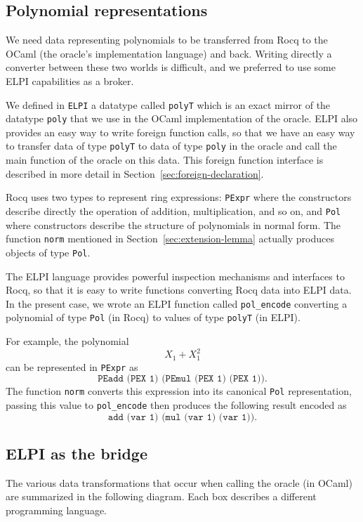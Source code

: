 \documentclass{jflart}
\begin{document}
\subsection{Polynomial representations}

We need data representing polynomials to be transferred from Rocq to the OCaml (the oracle's implementation language) and back.  Writing directly a converter between these two worlds is difficult, and we preferred to use some ELPI capabilities as a broker.

We defined in \texttt{ELPI} a datatype called \texttt{polyT} which is an exact mirror
of the datatype \texttt{poly} that we use in the OCaml implementation of the
oracle.  ELPI also provides an easy way to write foreign function calls, so
that we have an easy way to transfer data of type \texttt{polyT} to data of type \texttt{poly} in the oracle and call the main function of the oracle on this data.  This foreign function interface is described in more detail in Section~\ref{sec:foreign-declaration}.

Rocq uses two types to represent ring expressions: \texttt{PExpr} where the
constructors describe directly the operation of addition, multiplication, and
so on, and \texttt{Pol} where constructors describe the structure of polynomials
in normal form.  The function \texttt{norm} mentioned in
Section~\ref{sec:extension-lemma} actually produces objects of type \texttt{Pol}.

The ELPI language provides powerful inspection mechanisms and interfaces
to Rocq, so that it is easy to write functions converting Rocq data into ELPI
data.  In the present case, we wrote an ELPI function called
\texttt{pol\_encode} converting a polynomial
of type \texttt{Pol} (in Rocq) to values of type \texttt{polyT} (in ELPI).

For example, the polynomial
\[
  X_1+X_1^2
\]
can be represented in \texttt{PExpr} as
\[
  \texttt{PEadd (PEX 1) (PEmul (PEX 1) (PEX 1))}.
\]
The function \texttt{norm} converts this expression into its canonical
\texttt{Pol} representation, passing this value to \texttt{pol\_encode} then
produces the following result
encoded as
\[
  \texttt{add (var 1) (mul (var 1) (var 1))}.
\]

\subsection{ELPI as the bridge}
The various data transformations that occur when calling the oracle (in OCaml)
are summarized in the following diagram.  Each box describes a different
programming language.
\end{document}
